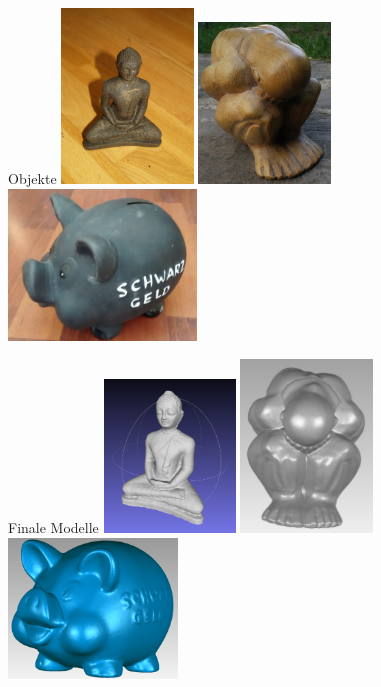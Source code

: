 \documentclass[11pt]{beamer}
\begin{document}
\begin{frame}{Objekte}
	\includegraphics[width=3.5cm]{images/Budha/Budha_Original.jpg}
	\includegraphics[width=3.5cm]{images/Mann_Original.jpg}
	\includegraphics[width=5cm]{images/sparschwein/photo.jpg}
\end{frame}

\begin{frame}{Finale Modelle}
	\includegraphics[width=3.5cm]{./Images/Budha/Budha_SfM_Untextured.png}
	\includegraphics[width=3.5cm]{images/Mann_Front}
	\includegraphics[width=4.5cm]{images/sparschwein/final}
\end{frame}
\end{document}
